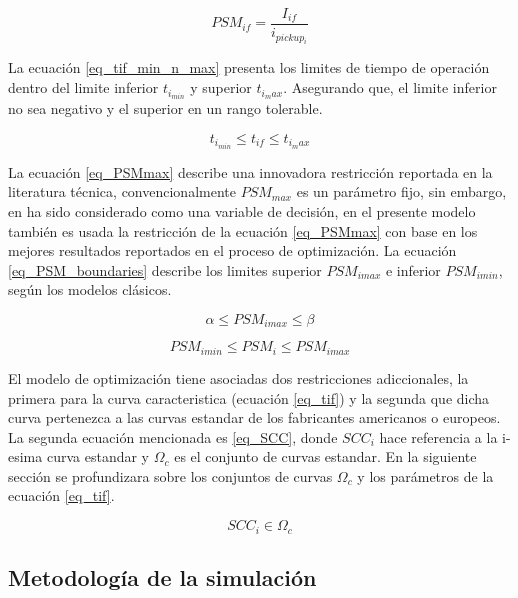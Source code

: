 \documentclass[journal,article,submit,pdftex,moreauthors]{Definitions/mdpi}
\begin{document}
\begin{equation}\label{eq_PSM}
    PSM_{if} = \frac{I_{if}}{i_{pickup_i}}
\end{equation}

La ecuación \ref{eq_tif_min_n_max} presenta los limites de tiempo de operación dentro del limite inferior $t_{i_{min}}$ y superior $t_{i_max}$. Asegurando que, el limite inferior no sea negativo y el superior en un rango tolerable.

\begin{equation}\label{eq_tif_min_n_max}
    t_{i_{min}} \leq t_{if} \leq t_{i_max}
\end{equation}

La ecuación \ref{eq_PSMmax} describe una innovadora restricción reportada en la literatura técnica, convencionalmente $PSM_{max}$ es un parámetro fijo, sin embargo, en \cite{saldarriaga-zuluaga_adaptive_2021} ha sido considerado como una variable de decisión, en el presente modelo también es usada la restricción de la ecuación \ref{eq_PSMmax} con base en los mejores resultados reportados en el proceso de optimización. La ecuación \ref{eq_PSM_boundaries} describe los limites superior $PSM_{imax}$ e inferior $PSM_{imin}$, según los modelos clásicos.

\begin{equation}\label{eq_PSMmax}
    \alpha \leq PSM_{imax} \leq \beta
\end{equation}

\begin{equation}\label{eq_PSM_boundaries}
    PSM_{imin} \leq PSM_{i} \leq PSM_{imax}
\end{equation}

El modelo de optimización tiene asociadas dos restricciones adiccionales, la primera para la curva caracteristica (ecuación \ref{eq_tif}) y la segunda que dicha curva pertenezca a las curvas estandar de los fabricantes americanos o europeos. La segunda ecuación mencionada es \ref{eq_SCC}, donde $SCC_i$ hace referencia a la i-esima curva estandar y $\Omega_c$ es el conjunto de curvas estandar. En la siguiente sección se profundizara sobre los conjuntos de curvas $\Omega_c$ y los parámetros de la ecuación \ref{eq_tif}.

\begin{equation}
\label{eq_SCC}
    SCC_i \in \Omega_c
\end{equation}

\subsection{Metodología de la simulación}
\end{document}
